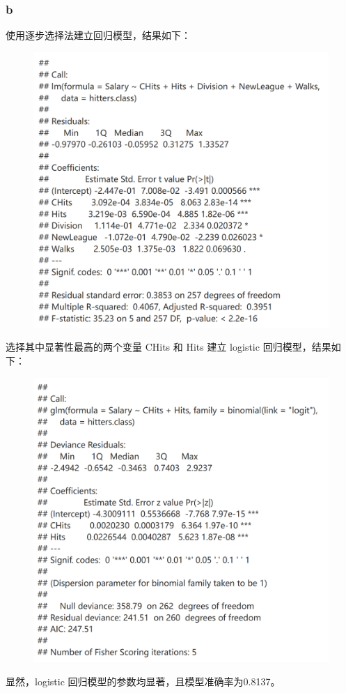 \documentclass[12pt,a4paper]{article}
\begin{document}
    \subsubsection*{b}
    使用逐步选择法建立回归模型，结果如下：
    \begin{figure}[H]
        \centering
        \includegraphics[scale=0.3]{StepwiseHitters.png}
    \end{figure}
    选择其中显著性最高的两个变量 CHits 和 Hits 建立 logistic 回归模型，结果如下：
    \begin{figure}[H]
        \centering
        \includegraphics[scale=0.3]{Logistic.png}
    \end{figure}
    显然，logistic 回归模型的参数均显著，且模型准确率为0.8137。
\end{document}
